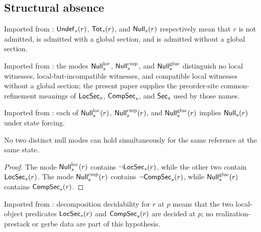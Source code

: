 ﻿\subsection{Structural absence}

\begin{definition}\label{def:undef-total-null}
Imported from \cite[Definition~4.10]{HomologicalVisibilityGluingObstructions2026}: $\mathsf{Undef}_s(r)$, $\mathsf{Tot}_s(r)$, and $\mathsf{Null}_s(r)$ respectively mean that $r$ is not admitted, is admitted with a global section, and is admitted without a global section.
\end{definition}

\begin{definition}\label{def:null-failure-modes}
Imported from \cite[Definition~4.11]{HomologicalVisibilityGluingObstructions2026}: the modes $\mathsf{Null}^{\mathrm{loc}}_s$, $\mathsf{Null}^{\mathrm{cmp}}_s$, and $\mathsf{Null}^{\mathrm{glue}}_s$ distinguish no local witnesses, local-but-incompatible witnesses, and compatible local witnesses without a global section; the present paper supplies the preorder-site common-refinement meanings of $\mathsf{LocSec}_s$, $\mathsf{CompSec}_s$, and $\mathsf{Sec}_s$ used by those names.
\end{definition}

\begin{proposition}\label{prop:null-modes-imply-null}
Imported from \cite[Proposition~4.12]{HomologicalVisibilityGluingObstructions2026}: each of $\mathsf{Null}^{\mathrm{loc}}_s(r)$, $\mathsf{Null}^{\mathrm{cmp}}_s(r)$, and $\mathsf{Null}^{\mathrm{glue}}_s(r)$ implies $\mathsf{Null}_s(r)$ under state forcing.
\end{proposition}

\begin{proposition}\label{prop:null-modes-exclusive}
No two distinct null modes can hold simultaneously for the same reference at the same state.
\end{proposition}

\begin{proof}
The mode $\mathsf{Null}^{\mathrm{loc}}_s(r)$ contains $\neg\mathsf{LocSec}_s(r)$, while the other two contain $\mathsf{LocSec}_s(r)$. The mode $\mathsf{Null}^{\mathrm{cmp}}_s(r)$ contains $\neg\mathsf{CompSec}_s(r)$, while $\mathsf{Null}^{\mathrm{glue}}_s(r)$ contains $\mathsf{CompSec}_s(r)$.
\end{proof}

\begin{definition}\label{def:decomposition-decidability}
Imported from \cite[Definition~4.14]{HomologicalVisibilityGluingObstructions2026}: decomposition decidability for $r$ at $p$ means that the two local-object predicates $\mathsf{LocSec}_s(r)$ and $\mathsf{CompSec}_s(r)$ are decided at $p$; no realization-prestack or gerbe data are part of this hypothesis.
\end{definition}

